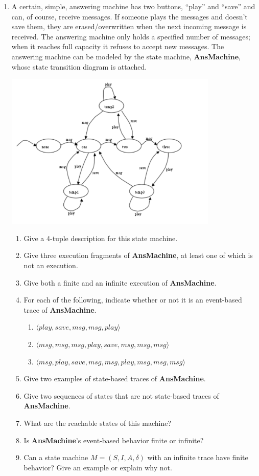 \documentclass{article}
\begin{document}

\begin{enumerate}

\item A certain, simple, answering machine has two buttons, ``play''
and ``save'' and can, of course, receive messages. If someone plays
the messages and doesn't save them, they are erased/overwritten when
the next incoming message is received. The answering machine only
holds a specified number of messages; when it reaches full capacity
it refuses to accept new messages. The answering machine can be
modeled by the state machine, $\mathbf{AnsMachine}$, whose state
transition diagram is attached.

\includegraphics[width=4in]{ansmachine.png}

\begin{enumerate}
 \item Give a 4-tuple description for this state machine.
 \item Give three execution fragments of {\bf AnsMachine}, at least one of which is not an
 execution.
 \item Give both a finite and an infinite execution of
 {\bf AnsMachine}.
 \item For each of the following, indicate whether or not it is an event-based trace of
 {\bf AnsMachine}.
 \begin{enumerate}
  \item  $\langle play, save, msg, msg, play \rangle$
  \item  $\langle msg, msg, msg, play, save, msg, msg, msg \rangle$
  \item  $\langle msg, play, save, msg, msg, play, msg, msg, msg \rangle$
 \end{enumerate}
 \item Give two examples of state-based traces of
 {\bf AnsMachine}.
 \item Give two sequences of
states that are not state-based traces of {\bf AnsMachine}.
\item What are the reachable states of this machine?
\item Is {\bf AnsMachine}'s event-based behavior finite or
infinite?
 \item Can a state machine $M=(S,I,A,\delta)$ with an infinite trace have finite
behavior? Give an example or explain why not.
\end{enumerate}


\end{enumerate}
\end{document}
